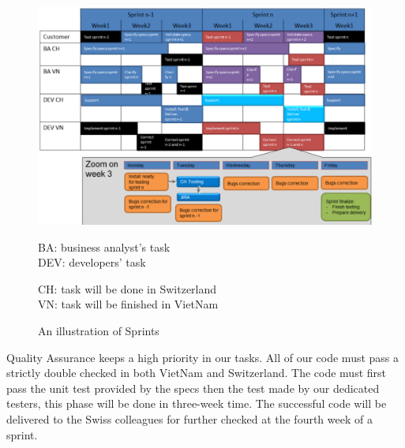 \begin{figure}
	\includegraphics[width=.85\textwidth]{pic_sprint.pdf}
	\caption{An illustration of Sprints} \label{fig_sprint}
	\begin{minipage}[c]{0.5\textwidth}
		BA: business analyst's task\\
		DEV: developers' task	
	\end{minipage}	
	\begin{minipage}[c]{0.5\textwidth}
		CH: task will be done in Switzerland\\
		VN: task will be finished in VietNam
	\end{minipage}	
\end{figure}
\par
Quality Assurance keeps a high priority in our tasks. All of our code must pass a strictly double checked in both VietNam and Switzerland.  The code must first pass the unit test provided by the specs then the test made by our dedicated testers, this phase will be done in three-week time. The successful code will be delivered to the Swiss colleagues for further checked at the fourth week of a sprint.
%

